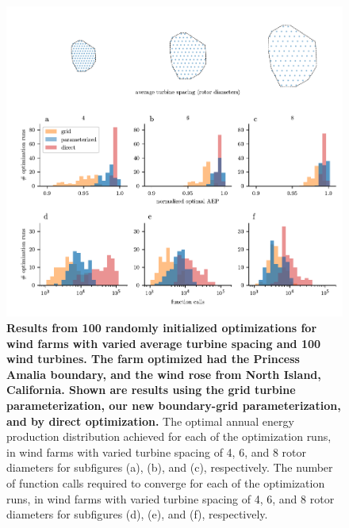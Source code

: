 \documentclass[wes, manuscript]{copernicus}
\providecommand{\DIFaddbeginFL}{} %
\providecommand{\DIFaddendFL}{} %
\providecommand{\DIFdelbeginFL}{} %
\providecommand{\DIFdelendFL}{} %
\begin{document}
\begin{figure}
\centering
\DIFdelbeginFL %
\DIFdelendFL \DIFaddbeginFL \includegraphics{paper-figures/results_spacingR1.pdf}
\DIFaddendFL \caption{\textbf{Results from 100 randomly initialized optimizations for wind farms with varied average turbine spacing and 100 wind turbines. The farm optimized had the Princess Amalia boundary, and the wind rose from North Island, California. Shown are results using the grid turbine parameterization, our new boundary-grid parameterization, and by direct optimization.} The optimal annual energy production distribution achieved for each of the optimization runs, in wind farms with varied turbine spacing of 4, 6, and 8 rotor diameters for subfigures (a), (b), and (c), respectively. The number of function calls required to converge for each of the optimization runs, in wind farms with varied turbine spacing of 4, 6, and 8 rotor diameters for subfigures (d), (e), and (f), respectively. }
\label{results-spacing}
\end{figure}
\end{document}
